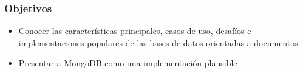 \begin{frame}
    \frametitle{Objetivos}

    \begin{itemize}
        \item Conocer las caracter\'isticas principales, casos de uso, desaf\'ios e implementaciones populares de las bases de datos orientadas a documentos
        \item Presentar a MongoDB como una implementaci\'on plausible
    \end{itemize}

\end{frame}